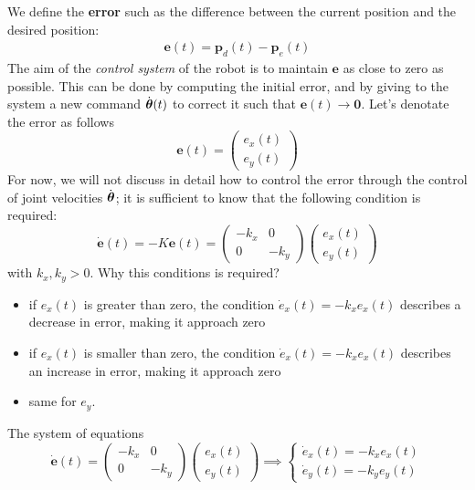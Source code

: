 \documentclass[10pt, letterpaper]{report}
\begin{document}
We define the \textbf{error} such as the difference between the current position and the desired position:\begin{eqnarray}
    \mathbf e(t)=\mathbf p_d(t)-\mathbf p_e(t)
\end{eqnarray}
The aim of the \textit{control system} of the robot is to maintain $\mathbf e$ as close to zero as possible. This can be done by computing the initial error, and by giving to the system a new command $\dot{{\boldsymbol{\theta}}}(t)$ to correct it such that $\mathbf e(t)\rightarrow\mathbf 0$. Let's denotate the error as follows\begin{equation}
    \mathbf e(t)=\begin{pmatrix}
        e_x(t)\\ e_y(t)
    \end{pmatrix}
\end{equation}
For now, we will not discuss in detail how to control the error through the control of joint velocities $\dot{{\boldsymbol{\theta}}}$; it is sufficient to know that the following condition is required:\begin{equation}
    \dot{\mathbf e}(t)=-K\mathbf e(t)=\begin{pmatrix}
        -k_x&0\\
        0&-k_y
    \end{pmatrix}\begin{pmatrix}
        e_x(t)\\ e_y(t)
    \end{pmatrix}
\end{equation}
with $k_x,k_y>0$.
Why this conditions is required?\begin{itemize}
    \item if $e_x(t)$ is greater than zero, the condition $\dot e_x(t)=-k_xe_x(t)$ describes a decrease in error, making it approach zero 
    \item if $e_x(t)$ is smaller than zero, the condition $\dot e_x(t)=-k_xe_x(t)$ describes an increase in error, making it approach zero 
    \item same for $e_y$.
\end{itemize}
The system of equations\begin{equation}
    \dot{\mathbf e}(t)=\begin{pmatrix}
        -k_x&0\\
        0&-k_y
    \end{pmatrix}\begin{pmatrix}
        e_x(t)\\ e_y(t)
    \end{pmatrix}\implies \begin{cases}
        \dot e_x(t)=-k_xe_x(t)\\
        \dot e_y(t)=-k_ye_y(t)
    \end{cases}
\end{equation}
\end{document}
